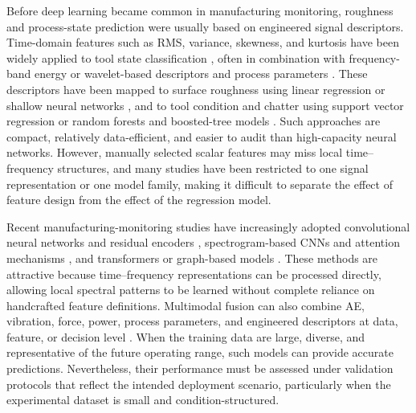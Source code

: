 Before deep learning became common in manufacturing monitoring, roughness and process-state prediction were usually based on engineered signal descriptors. Time-domain features such as RMS, variance, skewness, and kurtosis have been widely applied to tool state classification \cite{Byrne1995}, often in combination with frequency-band energy \cite{Antoni2006} or wavelet-based descriptors and process parameters \cite{Teti2010}. These descriptors have been mapped to surface roughness using linear regression or shallow neural networks \cite{Benardos2003}, and to tool condition and chatter using support vector regression \cite{Ozel2005} or random forests and boosted-tree models \cite{Wuest2016}. Such approaches are compact, relatively data-efficient, and easier to audit than high-capacity neural networks. However, manually selected scalar features may miss local time--frequency structures, and many studies have been restricted to one signal representation or one model family, making it difficult to separate the effect of feature design from the effect of the regression model.

Recent manufacturing-monitoring studies have increasingly adopted convolutional neural networks and residual encoders \cite{Wang2018}, spectrogram-based CNNs and attention mechanisms \cite{Khan2018}, and transformers or graph-based models \cite{Lei2020}. These methods are attractive because time--frequency representations can be processed directly, allowing local spectral patterns to be learned without complete reliance on handcrafted feature definitions. Multimodal fusion can also combine AE, vibration, force, power, process parameters, and engineered descriptors at data, feature, or decision level \cite{Khaleghi2013}. When the training data are large, diverse, and representative of the future operating range, such models can provide accurate predictions. Nevertheless, their performance must be assessed under validation protocols that reflect the intended deployment scenario, particularly when the experimental dataset is small and condition-structured.

